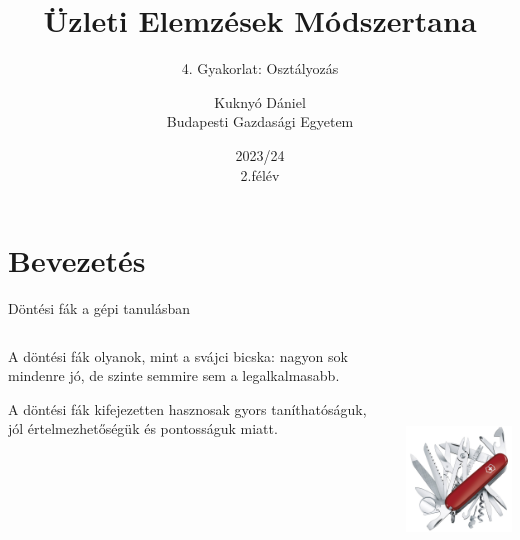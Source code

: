 \documentclass[english, aspectratio=169]{beamer}
\makeatletter
\newcommand\makebeamertitle{\frame{\maketitle}}
\let\origtableofcontents=\tableofcontents
\def\tableofcontents{\@ifnextchar[{\origtableofcontents}{\gobbletableofcontents}}
\def\gobbletableofcontents#1{\origtableofcontents}
\makeatother
\begin{document}
\section{Bevezetés}
\title[]{Üzleti Elemzések Módszertana}
\subtitle{4. Gyakorlat: Osztályozás}
\author[Kuknyó Dániel]{Kuknyó Dániel\\Budapesti Gazdasági Egyetem}
\date{2023/24\\2.félév}
\makebeamertitle

\begin{frame}
\tableofcontents{}
\end{frame}

\begin{frame}
\tableofcontents[currentsection]
\end{frame}

\begin{frame}{Döntési fák a gépi tanulásban}
\begin{columns}
\begin{column}{.5\textwidth}
A döntési fák olyanok, mint a svájci bicska: nagyon sok mindenre jó, de szinte semmire sem a legalkalmasabb.\par\medskip
A döntési fák kifejezetten hasznosak gyors taníthatóságuk, jól értelmezhetőségük és pontosságuk miatt.
\end{column}
\begin{column}{.5\textwidth}
\begin{center}
\includegraphics[width=5cm, height=7cm, keepaspectratio]{images/decision_trees_1.png}
\end{center}
\end{column}
\end{columns}
\end{frame}
\end{document}
